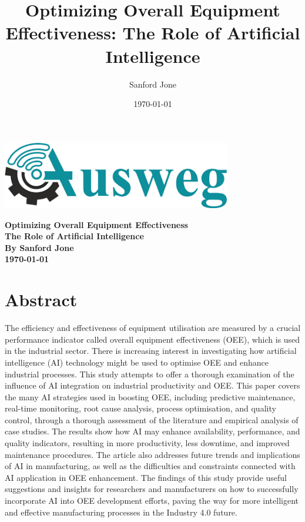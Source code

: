 \documentclass[12pt]{article}
\title{Optimizing Overall Equipment Effectiveness: The Role of Artificial Intelligence}
\author{Sanford Jone}
\date{\today}
\begin{document}
\begin{titlepage}
    \centering
    \vspace*{2cm}
    \includegraphics[width=10cm]{Ausweg comp 2.png} %
    \vspace{1.5cm}
    
    \Huge\textbf{Optimizing Overall Equipment Effectiveness} \\
    \vspace{0.5cm}
    \large\textbf{The Role of Artificial Intelligence} \\
    \vspace{1.5cm}
    \Large\textbf{By Sanford Jone} \\
    \vfill
    \large\textbf{\today} \\
    \vspace{1cm}
    
\end{titlepage}

\maketitle

\section{Abstract}
The efficiency and effectiveness of equipment utilisation are measured by a crucial performance indicator called overall equipment effectiveness (OEE), which is used in the industrial sector. There is increasing interest in investigating how artificial intelligence (AI) technology might be used to optimise OEE and enhance industrial processes. This study attempts to offer a thorough examination of the influence of AI integration on industrial productivity and OEE. This paper covers the many AI strategies used in boosting OEE, including predictive maintenance, real-time monitoring, root cause analysis, process optimisation, and quality control, through a thorough assessment of the literature and empirical analysis of case studies. The results show how AI may enhance availability, performance, and quality indicators, resulting in more productivity, less downtime, and improved maintenance procedures. The article also addresses future trends and implications of AI in manufacturing, as well as the difficulties and constraints connected with AI application in OEE enhancement. The findings of this study provide useful suggestions and insights for researchers and manufacturers on how to successfully incorporate AI into OEE development efforts, paving the way for more intelligent and effective manufacturing processes in the Industry 4.0 future.
\vspace{2cm}
\end{document}
